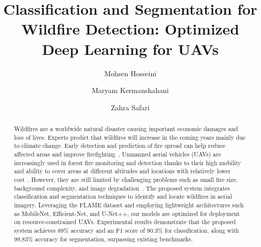 \documentclass[sigconf, noacm]{acmart}
\begin{document}
\title{Classification and Segmentation for Wildfire Detection: Optimized Deep Learning for UAVs}

\author{Mohsen Hosseini}

\author{Maryam Kermanshahani}
\author{Zahra Safari}


\begin{abstract}
Wildfires are a worldwide natural disaster causing important economic damages and loss of lives. Experts predict that wildfires will increase in the coming years mainly due to climate change. Early detection and prediction of fire spread can help reduce affected areas and improve firefighting~\cite{Ghali2022}. Unmanned aerial vehicles (UAVs) are increasingly used in forest fire monitoring and detection thanks to their high mobility and ability to cover areas at different altitudes and locations with relatively lower cost~\cite{Jiao2019}.  However, they are still limited by challenging problems such as small fire size, background complexity, and image degradation~\cite{Ghali2022}.
The proposed system integrates classification and segmentation techniques to identify and locate wildfires in aerial imagery. Leveraging the FLAME dataset and employing lightweight architectures such as MobileNet, Efficient-Net, and U-Net++, our models are optimized for deployment on resource-constrained UAVs. Experimental results demonstrate that the proposed system achieves 89\% accuracy and an F1 score of 90.3\% for classification, along with 99.83\% accuracy for segmentation, surpassing existing benchmarks.

\end{abstract}
\end{document}

